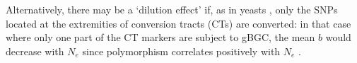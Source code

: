 Alternatively, there may be a ‘dilution effect’ if, as in yeasts \citep{lesecque2013gcbiased}, only the SNPs located at the extremities of conversion tracts (CTs) are converted: in that case where only one part of the CT markers are subject to gBGC, the mean $b$ would decrease with $N_e$ since polymorphism correlates positively with $N_e$ \citep{tajima1996amount,woolfit2009effective}.









